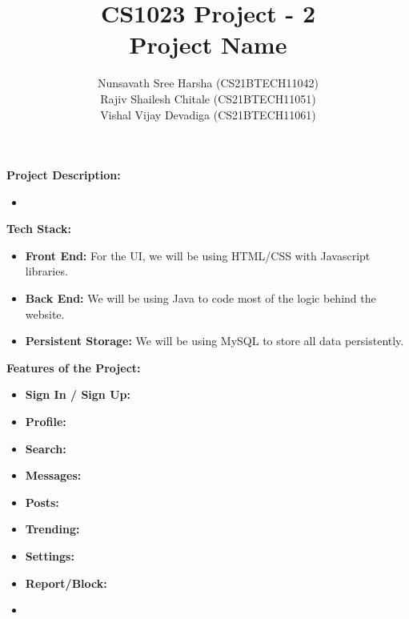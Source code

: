 \documentclass[journal,12pt,onecolumn]{IEEEtran}
\title{CS1023 Project - 2 \\ Project Name}
\author{Nunsavath Sree Harsha (CS21BTECH11042) \\ Rajiv Shailesh Chitale (CS21BTECH11051) \\ Vishal Vijay Devadiga (CS21BTECH11061)}
\date{}
\providecommand{\bo}[1]{\noindent \textbf{#1}}
\begin{document}
\maketitle
\bo{\large Project Description: }
\begin{itemize}
    \item
\end{itemize}
\bo{\large Tech Stack: }
\begin{itemize}
    \item \bo{Front End:} For the UI, we will be using HTML/CSS with Javascript libraries.
    \item \bo{Back End:} We will be using Java to code most of the logic behind the website.
    \item \bo{Persistent Storage:} We will be using MySQL to store all data persistently.
\end{itemize}
\bo{\large Features of the Project:}
\begin{itemize}
    \item \bo{Sign In / Sign Up:}
    \item \bo{Profile:}
    \item \bo{Search:}
    \item \bo{Messages:}
    \item \bo{Posts:}
    \item \bo{Trending:}
    \item \bo{Settings:}
    \item \bo{Report/Block:}
    \item \bo{}
\end{itemize}
\end{document}

